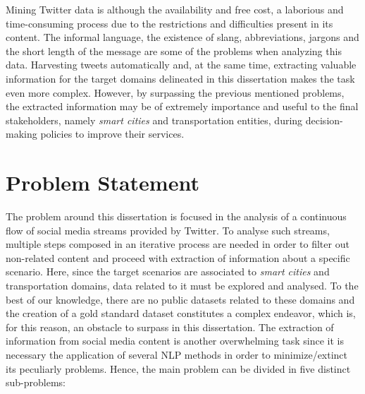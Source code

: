 Mining Twitter data is although the availability and free cost, a laborious and time-consuming process due to the restrictions and difficulties present in its content. The informal language, the existence of slang, abbreviations, jargons and the short length of the message are some of the problems when analyzing this data. Harvesting tweets automatically and, at the same time, extracting valuable information for the target domains delineated in this dissertation makes the task even more complex. However, by surpassing the previous mentioned problems, the extracted information may be of extremely importance and useful to the final stakeholders, namely \textit{smart cities} and transportation entities, during decision-making policies to improve their services.

\section{Problem Statement}\label{sec:problem}
The problem around this dissertation is focused in the analysis of a continuous flow of social media streams provided by Twitter. To analyse such streams, multiple steps composed in an iterative process are needed in order to filter out non-related content and proceed with extraction of information about a specific scenario. Here, since the target scenarios are associated to \textit{smart cities} and transportation domains, data related to it must be explored and analysed. To the best of our knowledge, there are no public datasets related to these domains and the creation of a gold standard dataset constitutes a complex endeavor, which is, for this reason, an obstacle to surpass in this dissertation. The extraction of information from social media content is another overwhelming task since it is necessary the application of several \gls{NLP} methods in order to minimize/extinct its peculiarly problems. Hence, the main problem can be divided in five distinct sub-problems:

